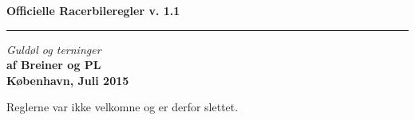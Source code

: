 \documentclass[12pt]{article}
\begin{document}
 \begin{flushright}
  {\Huge\bfseries Officielle Racerbileregler v. 1.1}\\
  \rule{\textwidth}{2pt}
  {\large\itshape Guldøl og terninger}\\
  {\bfseries af Breiner og PL\\[4ex]
K\o benhavn, Juli 2015\\}
 \end{flushright}
 \thispagestyle{empty}
 \clearpage


\newpage
Reglerne var ikke velkomne og er derfor slettet.
\end{document}
